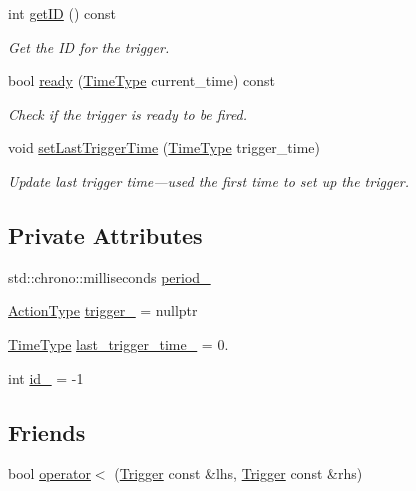 \begin{DoxyCompactItemize}
int \hyperlink{structvt_1_1timetrigger_1_1_trigger_add9337af4c0c64a4d9903555d2d74835}{get\+ID} () const
\begin{DoxyCompactList}\small\item\em Get the ID for the trigger. \end{DoxyCompactList}\item 
bool \hyperlink{structvt_1_1timetrigger_1_1_trigger_af00027850254b42fbcc2f5fde829b386}{ready} (\hyperlink{namespacevt_a876a9d0cd5a952859c72de8a46881442}{Time\+Type} current\+\_\+time) const
\begin{DoxyCompactList}\small\item\em Check if the trigger is ready to be fired. \end{DoxyCompactList}\item 
void \hyperlink{structvt_1_1timetrigger_1_1_trigger_aae694885195a12a0bd7274859bfaa0ba}{set\+Last\+Trigger\+Time} (\hyperlink{namespacevt_a876a9d0cd5a952859c72de8a46881442}{Time\+Type} trigger\+\_\+time)
\begin{DoxyCompactList}\small\item\em Update last trigger time---used the first time to set up the trigger. \end{DoxyCompactList}\end{DoxyCompactItemize}
\subsection*{Private Attributes}
\begin{DoxyCompactItemize}
\item 
std\+::chrono\+::milliseconds \hyperlink{structvt_1_1timetrigger_1_1_trigger_aa95009a5d9a17ffdb84b5317a7a5dfc2}{period\+\_\+}
\item 
\hyperlink{namespacevt_ae0a5a7b18cc99d7b732cb4d44f46b0f3}{Action\+Type} \hyperlink{structvt_1_1timetrigger_1_1_trigger_ac1d93e6fff9b0faa8889198e481d50d4}{trigger\+\_\+} = nullptr
\item 
\hyperlink{namespacevt_a876a9d0cd5a952859c72de8a46881442}{Time\+Type} \hyperlink{structvt_1_1timetrigger_1_1_trigger_ac844f5940943ca203c90dd485d47a0c6}{last\+\_\+trigger\+\_\+time\+\_\+} = 0.
\item 
int \hyperlink{structvt_1_1timetrigger_1_1_trigger_a1a640c2311fa49ed0a7b79480dda4439}{id\+\_\+} = -\/1
\end{DoxyCompactItemize}
\subsection*{Friends}
\begin{DoxyCompactItemize}
\item 
bool \hyperlink{structvt_1_1timetrigger_1_1_trigger_a9e42ae58737ff5be162e315dd41b1ee2}{operator$<$} (\hyperlink{structvt_1_1timetrigger_1_1_trigger}{Trigger} const \&lhs, \hyperlink{structvt_1_1timetrigger_1_1_trigger}{Trigger} const \&rhs)
\end{DoxyCompactItemize}


